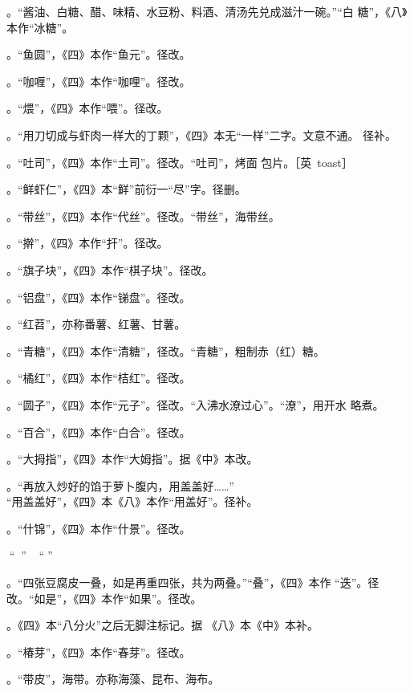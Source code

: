 。“酱油、白糖、醋、味精、水豆粉、料酒、清汤先兑成滋汁一碗。”“白
糖”，《八》本作“冰糖”。

。“鱼圆”，《四》本作“鱼元”。径改。

。“咖喱”，《四》本作“咖哩”。径改。

。“煨”，《四》本作“喂”。径改。

。“用刀切成与虾肉一样大的丁颗”，《四》本无“一样”二字。文意不通。
径补。

。“吐司”，《四》本作“土司”。径改。“吐司”，烤面
包片。［英~toast］

。“鲜虾仁”，《四》本“鲜”前衍一“尽”字。径删。

。“带丝”，《四》本作“代丝”。径改。“带丝”，海带丝。

。“擀”，《四》本作“扞”。径改。

。“旗子块”，《四》本作“棋子块”。径改。

。“铝盘”，《四》本作“锑盘”。径改。

。“红苕”，亦称番薯、红薯、甘薯。

。“青糖”，《四》本作“清糖”，径改。“青糖”，粗制赤（红）糖。

。“橘红”，《四》本作“桔红”。径改。

。“圆子”，《四》本作“元子”。径改。“入沸水潦过心”。“潦”，用开水
略煮。

。“百合”，《四》本作“白合”。径改。

。“大拇指”，《四》本作“大姆指”。据《中》本改。

。“再放入炒好的馅于萝卜腹内，用盖盖好……”\\%
“用盖盖好”，《四》本《八》本作“用盖好”。径补。

。“什锦”，《四》本作“什景”。径改。

。“𥑲水”，盐卤。“𥑲”字疑误。

。“四张豆腐皮一叠，如是再重四张，共为两叠。”“叠”，《四》本作
“迭”。径改。“如是”，《四》本作“如果”。径改。

。《四》本“八分火”之后无脚注标记{\footnotesize{}}。据
《八》本《中》本补。

。“椿芽”，《四》本作“春芽”。径改。

。“带皮”，海带。亦称海藻、昆布、海布。

